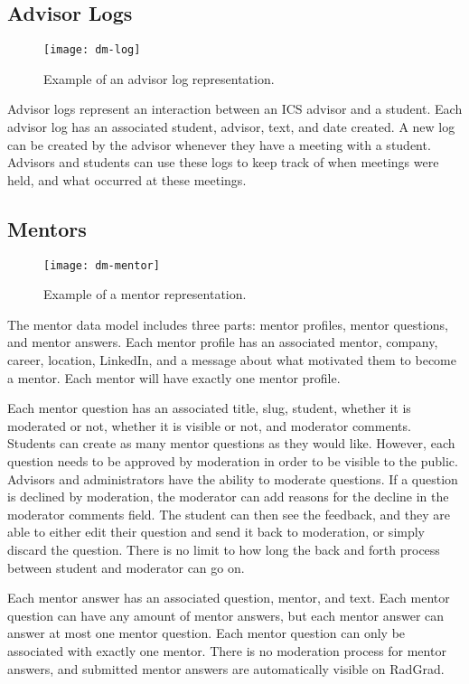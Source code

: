 \subsection{Advisor Logs}
\begin{figure}[h]
\centering
\texttt{[image: dm-log]}
\caption{Example of an advisor log representation.}
\end{figure}
Advisor logs represent an interaction between an ICS advisor and a student. Each advisor log has an associated student, advisor, text, and date created. A new log can be created by the advisor whenever they have a meeting with a student. Advisors and students can use these logs to keep track of when meetings were held, and what occurred at these meetings. 

\subsection{Mentors}
\begin{figure}[h]
\centering
\texttt{[image: dm-mentor]}
\caption{Example of a mentor representation.}
\end{figure}
The mentor data model includes three parts: mentor profiles, mentor questions, and mentor answers. Each mentor profile has an associated mentor, company, career, location, LinkedIn, and a message about what motivated them to become a mentor. Each mentor will have exactly one mentor profile.  

Each mentor question has an associated title, slug, student, whether it is moderated or not, whether it is visible or not, and moderator comments. Students can create as many mentor questions as they would like. However, each question needs to be approved by moderation in order to be visible to the public. Advisors and administrators have the ability to moderate questions. If a question is declined by moderation, the moderator can add reasons for the decline in the moderator comments field. The student can then see the feedback, and they are able to either edit their question and send it back to moderation, or simply discard the question. There is no limit to how long the back and forth process between student and moderator can go on. 

Each mentor answer has an associated question, mentor, and text. Each mentor question can have any amount of mentor answers, but each mentor answer can answer at most one mentor question. Each mentor question can only be associated with exactly one mentor. There is no moderation process for mentor answers, and submitted mentor answers are automatically visible on RadGrad. 

